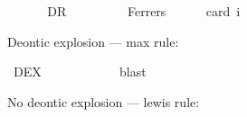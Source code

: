 \begin{isabellebody}
%
\endisatagproof
{\isafoldproof}%
%
\isadelimproof
\ \isanewline
%
\endisadelimproof
\isanewline
{}\isamarkupfalse%
\ \isanewline
\ \ \ DR{\isacharcolon}{\kern0pt}\ {\isachardoublequoteopen}{\isasymlfloor}{\isasymodot}{\isacharless}{\kern0pt}{\isasymchi}{\isacharbar}{\kern0pt}{\isasymphi}\isactrlbold {\isasymor}{\isasympsi}{\isachargreater}{\kern0pt}\ \isactrlbold {\isasymrightarrow}\ {\isacharparenleft}{\kern0pt}{\isasymodot}{\isacharless}{\kern0pt}{\isasymchi}{\isacharbar}{\kern0pt}{\isasymphi}{\isachargreater}{\kern0pt}\ \isactrlbold {\isasymor}\ {\isasymodot}{\isacharless}{\kern0pt}{\isasymchi}{\isacharbar}{\kern0pt}{\isasympsi}{\isachargreater}{\kern0pt}{\isacharparenright}{\kern0pt}{\isasymrfloor}{\isachardoublequoteclose}\ \isanewline
\ \ \ Ferrers\ \ \isanewline
\ \ \isamarkupfalse%
\ {\isacharbrackleft}{\kern0pt}card\ i{\isacharequal}{\kern0pt}{}{\isacharbrackright}{\kern0pt}\ %
\isanewline
%
\isadelimproof
\ \ %
\endisadelimproof
%
\isatagproof
{}\isamarkupfalse%
%
\endisatagproof
{\isafoldproof}%
%
\isadelimproof
%
\endisadelimproof
%
\isadelimdocument
%
\endisadelimdocument
%
\isatagdocument
%
\isamarkuptrue%
%
\endisatagdocument
{\isafolddocument}%
%
\isadelimdocument
%
\endisadelimdocument
%
\begin{isamarkuptext}%
Deontic explosion — max rule:%
\end{isamarkuptext}\isamarkuptrue%
\isamarkupfalse%
\ DEX{\isacharcolon}{\kern0pt}\ {\isachardoublequoteopen}{\isasymlfloor}{\isacharparenleft}{\kern0pt}{\isasymdiamond}{\isasymphi}\ \isactrlbold {\isasymand}\ {\isasymcircle}{\isacharless}{\kern0pt}{\isasympsi}{\isacharbar}{\kern0pt}{\isasymphi}{\isachargreater}{\kern0pt}\ \isactrlbold {\isasymand}\ {\isasymcircle}{\isacharless}{\kern0pt}\isactrlbold {\isasymnot}{\isasympsi}{\isacharbar}{\kern0pt}{\isasymphi}{\isachargreater}{\kern0pt}{\isacharparenright}{\kern0pt}\ \isactrlbold {\isasymrightarrow}\ {\isasymcircle}{\isacharless}{\kern0pt}{\isasymchi}{\isacharbar}{\kern0pt}{\isasymphi}{\isachargreater}{\kern0pt}{\isasymrfloor}{\isachardoublequoteclose}\ \isanewline
%
\isadelimproof
\ \ %
\endisadelimproof
%
\isatagproof
{}\isamarkupfalse%
\ blast%
\endisatagproof
{\isafoldproof}%
%
\isadelimproof
%
\endisadelimproof
%
\begin{isamarkuptext}%
No deontic explosion — lewis rule:%
\end{isamarkuptext}\isamarkuptrue%

\end{isabellebody}
